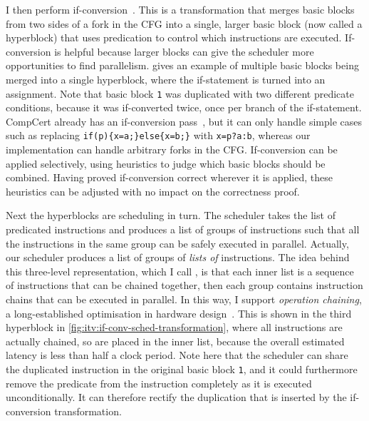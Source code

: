I then perform if-conversion~\cite{allen83_conver_contr_depen_data_depen}. This
is a transformation that merges basic blocks from two sides of a fork in the CFG
into a single, larger basic block (now called a hyperblock) that uses
predication to control which instructions are executed.  If-conversion is
helpful because larger blocks can give the scheduler more opportunities to find
parallelism.   gives an example of
multiple \rtl{} basic blocks being merged into a single hyperblock, where the
if-statement is turned into an assignment.  Note that basic block \texttt{1} was
duplicated with two different predicate conditions, because it was if-converted
twice, once per branch of the if-statement.  CompCert already has an
if-conversion pass~\cite{absint19_compc}, but it can only handle simple cases
such as replacing \texttt{if(p)\{x=a;\}else\{x=b;\}} with \texttt{x=p?a:b},
whereas our implementation can handle arbitrary forks in the CFG.  If-conversion
can be applied selectively, using heuristics to judge which basic blocks should
be combined. Having proved if-conversion correct wherever it is applied, these
heuristics can be adjusted with no impact on the correctness proof.

Next the hyperblocks are scheduling in turn. The scheduler takes the list of
predicated instructions and produces a list of groups of instructions such that
all the instructions in the same group can be safely executed in parallel.
Actually, our scheduler produces a list of groups of \emph{lists of}
instructions.  The idea behind this three-level representation, which I call
\rtlpar, is that each inner list is a sequence of instructions that can be
chained together, then each group contains instruction chains that can be
executed in parallel. In this way, I support \emph{operation chaining}, a
long-established optimisation in hardware
design~\cite[p.~1101]{pangrle87_desig_tools_intel_silic_compil}.  This is shown
in the third hyperblock in \cref{fig:itv:if-conv-sched-transformation}, where
all instructions are actually chained, so are placed in the inner list, because
the overall estimated latency is less than half a clock period.  Note here that
the scheduler can share the duplicated instruction in the original basic block
\texttt{1}, and it could furthermore remove the predicate from the instruction
completely as it is executed unconditionally.  It can therefore rectify the
duplication that is inserted by the if-conversion transformation.

